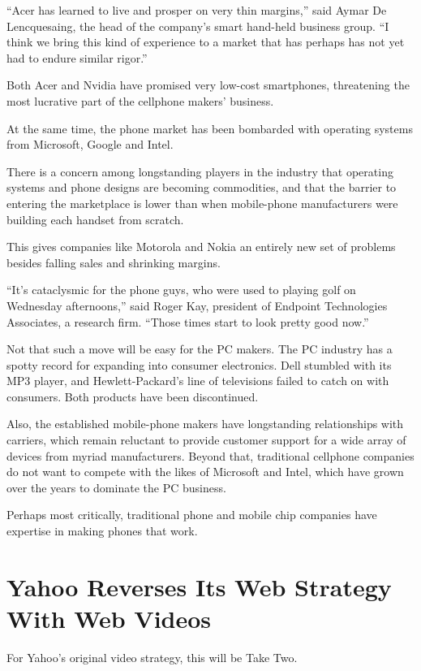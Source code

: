 \documentclass[12pt,a4paper,onecolumn]{article}
\begin{document}
\begin{CJK*}{GBK}{song}
``Acer has learned to live and prosper on very thin margins,'' said Aymar De Lencquesaing, the head
of the company's smart hand-held business group. ``I think we bring this kind of experience to a
market that has perhaps has not yet had to endure similar rigor.''

Both Acer and Nvidia have promised very low-cost smartphones, threatening the most lucrative part of
the cellphone makers' business.

At the same time, the phone market has been bombarded with operating systems from Microsoft, Google
and Intel.

There is a concern among longstanding players in the industry that operating systems and phone
designs are becoming commodities, and that the barrier to entering the marketplace is lower than
when mobile-phone manufacturers were building each handset from scratch.

This gives companies like Motorola and Nokia an entirely new set of problems besides falling sales
and shrinking margins.

``It's cataclysmic for the phone guys, who were used to playing golf on Wednesday afternoons,'' said
Roger Kay, president of Endpoint Technologies Associates, a research firm. ``Those times start to
look pretty good now.''

Not that such a move will be easy for the PC makers. The PC industry has a spotty record for
expanding into consumer electronics. Dell stumbled with its MP3 player, and Hewlett-Packard's line
of televisions failed to catch on with consumers. Both products have been discontinued.

Also, the established mobile-phone makers have longstanding relationships with carriers, which
remain reluctant to provide customer support for a wide array of devices from myriad manufacturers.
Beyond that, traditional cellphone companies do not want to compete with the likes of Microsoft and
Intel, which have grown over the years to dominate the PC business.

Perhaps most critically, traditional phone and mobile chip companies have expertise in making phones
that work.

\section{Yahoo Reverses Its Web Strategy With Web Videos}

For Yahoo's original video strategy, this will be Take Two.


\end{CJK*}
\end{document}
